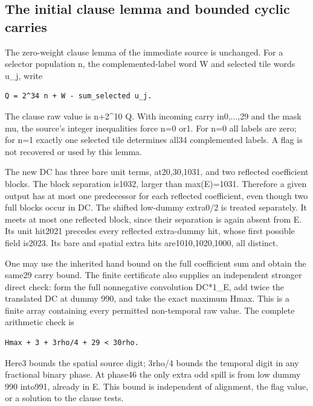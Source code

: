 \subsection{The initial clause lemma and bounded cyclic carries}
The zero-weight clause lemma of the immediate source is unchanged. For a selector population n, the complemented-label word W and selected tile words u\_j, write

\begin{Verbatim}[fontsize=\small,breaklines=true,breakanywhere=true,breaksymbolleft={}]
Q = 2^34 n + W - sum_selected u_j.
\end{Verbatim}

The clause raw value is n+2\textasciicircum{}10 Q. With incoming carry in0,...,29 and the mask mu, the source's integer inequalities force n=0 or1. For n=0 all labels are zero; for n=1 exactly one selected tile determines all34 complemented labels. A flag is not recovered or used by this lemma.

The new DC has three bare unit terms, at20,30,1031, and two reflected coefficient blocks. The block separation is1032, larger than max(E)=1031. Therefore a given output has at most one predecessor for each reflected coefficient, even though two full blocks occur in DC. The shifted low-dummy extra0/2 is treated separately. It meets at most one reflected block, since their separation is again absent from E. Its unit hit2021 precedes every reflected extra-dummy hit, whose first possible field is2023. Its bare and spatial extra hits are1010,1020,1000, all distinct.

One may use the inherited hand bound on the full coefficient sum and obtain the same29 carry bound. The finite certificate also supplies an independent stronger direct check: form the full nonnegative convolution DC*1\_E, add twice the translated DC at dummy 990, and take the exact maximum Hmax. This is a finite array containing every permitted non-temporal raw value. The complete arithmetic check is

\begin{Verbatim}[fontsize=\small,breaklines=true,breakanywhere=true,breaksymbolleft={}]
Hmax + 3 + 3rho/4 + 29 < 30rho.
\end{Verbatim}

Here3 bounds the spatial source digit; 3rho/4 bounds the temporal digit in any fractional binary phase. At phase46 the only extra odd spill is from low dummy 990 into991, already in E. This bound is independent of alignment, the flag value, or a solution to the clause tests.

